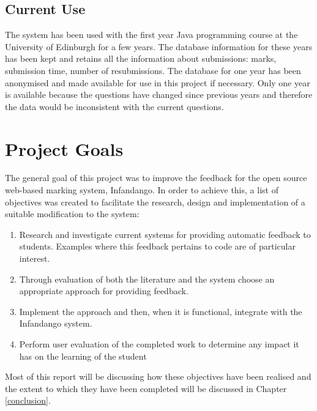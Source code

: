 \subsection{Current Use}
The system has been used with the first year Java programming course at the University of Edinburgh for a few years. The database information for these years has been kept and retains all the information about submissions: marks, submission time, number of resubmissions. The database for one year has been anonymised and made available for use in this project if necessary. Only one year is available because the questions have changed since previous years and therefore the data would be inconsistent with the current questions.

\section{Project Goals}
The general goal of this project was to improve the feedback for the open source web-based marking system, Infandango\cite{infandango_note}. In order to achieve this, a list of objectives was created to facilitate the research, design and implementation of a suitable modification to the system:

\begin{enumerate}
\item Research and investigate current systems for providing automatic feedback to students. Examples where this feedback pertains to code are of particular interest.
\item Through evaluation of both the literature and the system choose an appropriate approach for providing feedback.
\item Implement the approach and then, when it is functional, integrate with the Infandango system.
\item Perform user evaluation of the completed work to determine any impact it has on the learning of the student
\end{enumerate}

Most of this report will be discussing how these objectives have been realised and the extent to which they have been completed will be discussed in Chapter \ref{conclusion}.
